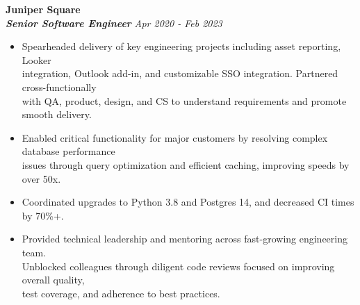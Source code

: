 \documentclass[]{resume}
\newcommand\tab[1][.5cm]{\hspace*{#1}}
\begin{document}
\begin{resume}
\vspace{0.9mm}
\textbf{\large Juniper Square}\\
\tab \textbf{\textit{Senior Software Engineer}} \hfill \textit{Apr 2020 - Feb 2023}
\begin{itemize}
    \item
    Spearheaded delivery of key engineering projects including asset reporting, Looker \\
    integration, Outlook add-in, and customizable SSO integration. Partnered cross-functionally \\
    with QA, product, design, and CS to understand requirements and promote smooth delivery.
    \item
    Enabled critical functionality for major customers by resolving complex database performance \\
    issues through query optimization and efficient caching, improving speeds by over 50x.
    \item
    Coordinated upgrades to Python 3.8 and Postgres 14, and decreased CI times by 70\%+.
    \item
    Provided technical leadership and mentoring across fast-growing engineering team. \\
    Unblocked colleagues through diligent code reviews focused on improving overall quality, \\
    test coverage, and adherence to best practices.
\end{itemize}


\end{resume}
\end{document}
